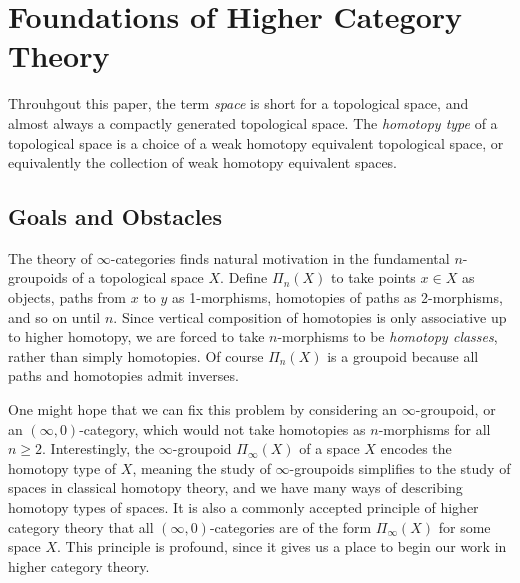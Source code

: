 \section{Foundations of Higher Category Theory}\label{sec1.1}

\begin{terminology}\label{1.1.0.1}
	Throuhgout this paper, the term \emph{space} is short for a topological space, and almost always a compactly generated topological space. The \emph{homotopy type} of a topological space is a choice of a weak homotopy equivalent topological space, or equivalently the collection of weak homotopy equivalent spaces.
\end{terminology}

\subsection{Goals and Obstacles}\label{sec1.1.1}

The theory of $\infty $-categories finds natural motivation in the fundamental $n$-groupoids of a topological space $X$. Define $\Pi_n(X)$ to take points $x\in X$ as objects, paths from $x$ to $y$ as 1-morphisms, homotopies of paths as 2-morphisms, and so on until $n$. Since vertical composition of homotopies is only associative up to higher homotopy, we are forced to take $n$-morphisms to be \emph{homotopy classes}, rather than simply homotopies. Of course $\Pi_n(X)$ is a groupoid because all paths and homotopies admit inverses.

One might hope that we can fix this problem by considering an $\infty $-groupoid, or an $(\infty ,0)$-category, which would not take homotopies as $n$-morphisms for all $n\geq 2$. Interestingly, the $\infty $-groupoid $\Pi_\infty (X)$ of a space $X$ encodes the homotopy type of $X$, meaning the study of $\infty $-groupoids simplifies to the study of spaces in classical homotopy theory, and we have many ways of describing homotopy types of spaces. It is also a commonly accepted principle of higher category theory that all $(\infty ,0)$-categories are of the form $\Pi_\infty (X)$ for some space $X$. This principle is profound, since it gives us a place to begin our work in higher category theory.

